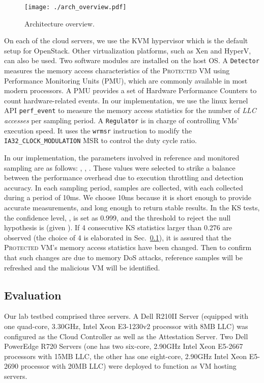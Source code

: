 \documentclass{sig-alternate}
\newcommand{\mbytes}{\ensuremath{\mathrm{MB}}\xspace}
\newcommand{\ghertz}{\ensuremath{\mathrm{GHz}}\xspace}
\newcommand{\attackname}{memory DoS attacks\xspace}
\newcommand{\protectedVM}{\textsc{Protected VM}\xspace}
\newcommand{\secref}[1]{\mbox{Sec.~\ref{#1}}\xspace}
\begin{document}
\begin{figure}[t]
\centerline{\mbox{\texttt{[image: ./arch\_overview.pdf]}}}
\caption{Architecture overview.}
\label{fig:arch_overview}
\end{figure}




On each of the cloud servers, we use the KVM hypervisor which is the default setup for OpenStack. Other virtualization platforms, such as Xen and HyperV, can also be used. Two software modules are installed on the host OS. A \texttt{Detector} measures the memory access characteristics of the \protectedVM using Performance Monitoring Units (PMU), which are commonly available in most modern processors. A PMU provides a set of Hardware Performance Counters to count hardware-related events. In our implementation, we use the linux kernel API \texttt{perf\_event} to measure the memory access statistics for the number of \textit{LLC accesses} per sampling period. A \texttt{Regulator} is in charge of controlling VMs' execution speed. It uses the \texttt{wrmsr} instruction to modify the \texttt{IA32\_CLOCK\_MODULATION} MSR to control the duty cycle ratio.


In our implementation, the parameters involved in reference and monitored sampling 
are as follows: , ,  . These values were 
selected to strike a balance between the performance overhead due to execution
throttling and detection accuracy. In each sampling period,  samples 
are collected, with each collected during a period of 10ms. We choose 10ms 
because it is short enough to provide accurate measurements, and long enough to 
return stable results. In the KS tests, the confidence level, , is set 
as 0.999, and the threshold to reject the null hypothesis is  
(given ). If 4 consecutive KS statistics larger than 0.276 are 
observed (the choice of 4 is elaborated in \secref{sec:evaluation}), it is assured 
that the \protectedVM's memory access statistics have been changed. Then to 
confirm that such changes are due to \attackname, reference samples will be 
refreshed and the malicious VM will be identified.


\subsection{Evaluation}
\label{sec:evaluation}

Our lab testbed comprised three servers. A Dell R210II Server (equipped with 
one quad-core, 3.30\ghertz, Intel Xeon E3-1230v2 processor with 8\mbytes LLC) was 
configured as the Cloud Controller as well as the Attestation Server. Two Dell 
PowerEdge R720 Servers (one has two six-core, 2.90\ghertz Intel Xeon E5-2667 processors with 
15\mbytes LLC, the other has one eight-core, 2.90\ghertz Intel Xeon E5-2690 
processor with 20\mbytes LLC) were deployed to function as VM hosting servers. 
\end{document}
